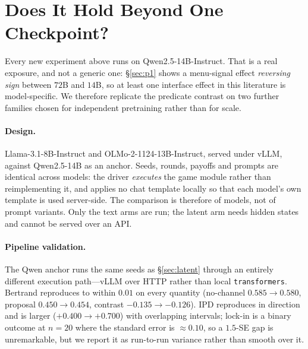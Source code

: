\section{Does It Hold Beyond One Checkpoint?}
\label{sec:generality}

Every new experiment above runs on Qwen2.5-14B-Instruct. That is a real exposure, and
not a generic one: \S\ref{sec:p1} shows a menu-signal effect \emph{reversing sign}
between $72$B and $14$B, so at least one interface effect in this literature is
model-specific. We therefore replicate the predicate contrast on two further families
chosen for independent pretraining rather than for scale.

\paragraph{Design.}
Llama-3.1-8B-Instruct and OLMo-2-1124-13B-Instruct, served under vLLM, against
Qwen2.5-14B as an anchor. Seeds, rounds, payoffs and prompts are identical across
models: the driver \emph{executes} the game module rather than reimplementing it, and
applies no chat template locally so that each model's own template is used
server-side. The comparison is therefore of models, not of prompt variants. Only the
text arms are run; the latent arm needs hidden states and cannot be served over an API.

\paragraph{Pipeline validation.}
The Qwen anchor runs the same seeds as \S\ref{sec:latent} through an entirely
different execution path---vLLM over HTTP rather than local \texttt{transformers}.
Bertrand reproduces to within $0.01$ on every quantity (no-channel $0.585\to0.580$,
proposal $0.450\to0.454$, contrast $-0.135\to-0.126$). IPD reproduces in direction and
is larger ($+0.400\to+0.700$) with overlapping intervals; lock-in is a binary outcome
at $n{=}20$ where the standard error is $\approx0.10$, so a $1.5$-SE gap is
unremarkable, but we report it as run-to-run variance rather than smooth over it.

